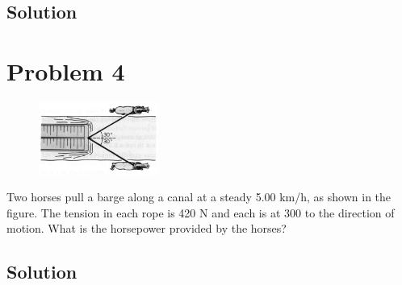 \documentclass[12pt]{article}
\begin{document}
\subsection*{Solution}


\pagebreak
\section*{Problem 4}
\begin{figure}
    \vspace{-30pt}
    \includegraphics[width=0.35\textwidth]{graph_4.png} 
\end{figure}
Two horses pull a barge along a canal at a steady 5.00 km/h, as shown in the figure. The tension in each rope is 420 N and each is at 300 to the direction of motion. What is the horsepower provided by the horses?

\subsection*{Solution}


\pagebreak
\end{document}
